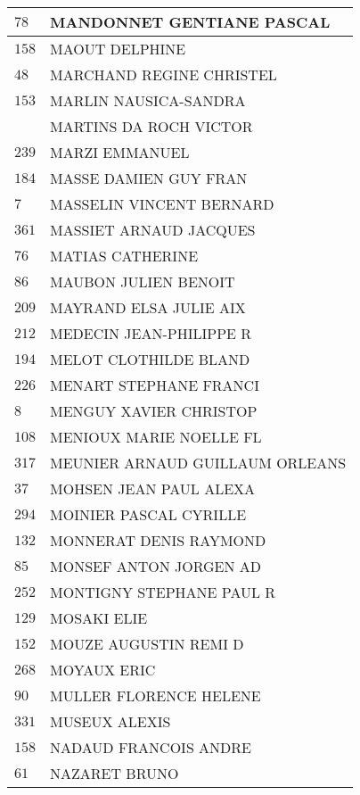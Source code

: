 \begin{xltabular}{\linewidth}{|l|X|}
    \hline
    $78$ & MANDONNET GENTIANE PASCAL \\
    \hline
    $158$ & MAOUT DELPHINE \\
    \hline
    $48$ & MARCHAND REGINE CHRISTEL \\
    \hline
    $153$ & MARLIN NAUSICA-SANDRA \\
    \hline
    & MARTINS DA ROCH VICTOR \\
    \hline
    $239$ & MARZI EMMANUEL \\
    \hline
    $184$ & MASSE DAMIEN GUY FRAN \\
    \hline
    $7$ & MASSELIN VINCENT BERNARD \\
    \hline
    $361$ & MASSIET ARNAUD JACQUES \\
    \hline
    $76$ & MATIAS CATHERINE \\
    \hline
    $86$ & MAUBON JULIEN BENOIT \\
    \hline
    $209$ & MAYRAND ELSA JULIE AIX \\
    \hline
    $212$ & MEDECIN JEAN-PHILIPPE R \\
    \hline
    $194$ & MELOT CLOTHILDE BLAND \\
    \hline
    $226$ & MENART STEPHANE FRANCI \\
    \hline
    $8$ & MENGUY XAVIER CHRISTOP \\
    \hline
    $108$ & MENIOUX MARIE NOELLE FL \\
    \hline
    $317$ & MEUNIER ARNAUD GUILLAUM ORLEANS \\
    \hline
    $37$ & MOHSEN JEAN PAUL ALEXA \\
    \hline
    $294$ & MOINIER PASCAL CYRILLE \\
    \hline
    $132$ & MONNERAT DENIS RAYMOND \\
    \hline
    $85$ & MONSEF ANTON JORGEN AD \\
    \hline
    $252$ & MONTIGNY STEPHANE PAUL R \\
    \hline
    $129$ & MOSAKI ELIE \\
    \hline
    $152$ & MOUZE AUGUSTIN REMI D \\
    \hline
    $268$ & MOYAUX ERIC \\
    \hline
    $90$ & MULLER FLORENCE HELENE \\
    \hline
    $331$ & MUSEUX ALEXIS \\
    \hline
    $158$ & NADAUD FRANCOIS ANDRE \\
    \hline
    $61$ & NAZARET BRUNO \\

\end{xltabular}
